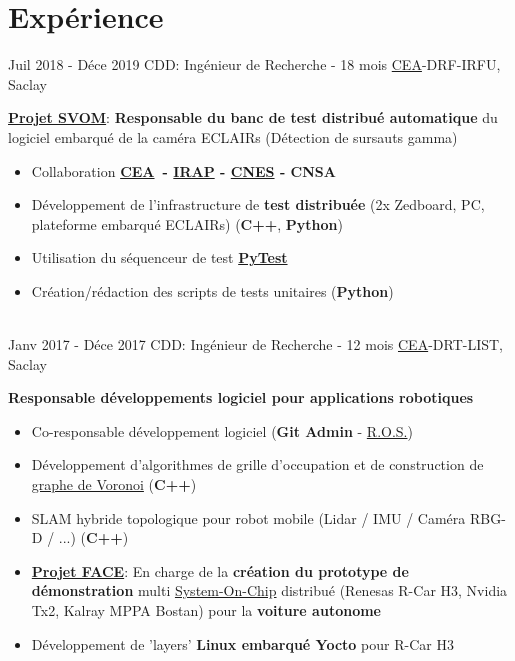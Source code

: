 \documentclass[letterpaper]{twentysecondcv} %
\newcommand{\cea}{\href{http://www.cea.fr/}{CEA}}
\newcommand{\ros}{\href{http://www.ros.org/}{R.O.S.}}
\begin{document}
\section{Expérience}
\begin{twenty} %
  \twentyitem
  {Juil 2018 -}
  {Déce 2019}
  {CDD: Ingénieur de Recherche - 18 mois}
  {\cea-DRF-IRFU, Saclay}
  {
    \textbf{\href{http://www.svom.fr/}{Projet SVOM}}: \textbf{Responsable du banc de
    test distribué automatique} du logiciel embarqué de la caméra ECLAIRs
    (Détection de sursauts gamma)
    \begin{itemize}
    \item Collaboration \textbf{\cea\ - \href{http://www.irap.omp.eu/}{IRAP} -
        \href{https://cnes.fr/fr}{CNES} - CNSA}
    \item Développement de l'infrastructure de \textbf{test distribuée} (2x Zedboard, PC,
      plateforme embarqué ECLAIRs) (\textbf{C++}, \textbf{Python})
    \item Utilisation du séquenceur de test \textbf{\href{https://docs.pytest.org/en/latest/contents.html}{PyTest}}
    \item Création/rédaction des scripts de tests unitaires (\textbf{Python})
    \end{itemize}
  }
  \\
  \twentyitem
  {Janv 2017 -}
  {Déce 2017}
  {CDD: Ingénieur de Recherche - 12 mois}
  {\cea-DRT-LIST, Saclay}
  {
    \textbf{Responsable développements logiciel pour applications robotiques}
    \begin{itemize}
    \item Co-responsable développement logiciel (\textbf{Git Admin} - \ros)
    \item Développement d'algorithmes de grille d'occupation et de construction
      de \href{https://fr.wikipedia.org/wiki/Diagramme_de_Vorono\%C3\%AF}{graphe
        de Voronoi} (\textbf{C++})
    \item SLAM hybride topologique pour robot mobile (Lidar / IMU / Caméra RBG-D
      / ...) (\textbf{C++})
    \item
      \textbf{\href{https://www.designspot.fr/portfolio/face/}{Projet
          FACE}}: En charge de la \textbf{création du prototype de démonstration} multi
      \href{https://en.wikipedia.org/wiki/System_on_a_chip}{System-On-Chip}
      distribué (Renesas R-Car H3, Nvidia Tx2, Kalray MPPA Bostan) pour la
      \textbf{voiture autonome}
    \item Développement de 'layers' \textbf{Linux embarqué Yocto} pour R-Car H3

\end{itemize}}
\end{twenty}
\end{document}
